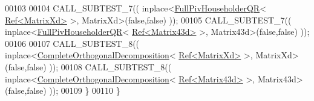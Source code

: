 \begin{DoxyCode}
00103 
00104     CALL\_SUBTEST\_7(( inplace<\hyperlink{group___q_r___module_class_eigen_1_1_full_piv_householder_q_r}{FullPivHouseholderQR}<
      \hyperlink{group___core___module_class_eigen_1_1_ref}{Ref<MatrixXd>} >, MatrixXd>(\textcolor{keyword}{false},\textcolor{keyword}{false}) ));
00105     CALL\_SUBTEST\_7(( inplace<\hyperlink{group___q_r___module_class_eigen_1_1_full_piv_householder_q_r}{FullPivHouseholderQR}<
      \hyperlink{group___core___module_class_eigen_1_1_ref}{Ref<Matrix43d>} >, Matrix43d>(\textcolor{keyword}{false},\textcolor{keyword}{false}) ));
00106 
00107     CALL\_SUBTEST\_8(( inplace<\hyperlink{group___q_r___module_class_eigen_1_1_complete_orthogonal_decomposition}{CompleteOrthogonalDecomposition}<
      \hyperlink{group___core___module_class_eigen_1_1_ref}{Ref<MatrixXd>} >, MatrixXd>(\textcolor{keyword}{false},\textcolor{keyword}{false}) ));
00108     CALL\_SUBTEST\_8(( inplace<\hyperlink{group___q_r___module_class_eigen_1_1_complete_orthogonal_decomposition}{CompleteOrthogonalDecomposition}<
      \hyperlink{group___core___module_class_eigen_1_1_ref}{Ref<Matrix43d>} >, Matrix43d>(\textcolor{keyword}{false},\textcolor{keyword}{false}) ));
00109   \}
00110 \}
\end{DoxyCode}
